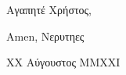 \documentclass[a4paper,12pt]{article}
\begin{document}
    \pagestyle{plain}
    \rmfamily\normalsize
    \setlength{\parskip}{13pt}
    \setlength{\baselineskip}{17pt}

    \normalsize

    Αγαπητέ Χρήστος,

    \lipsum[1]

    \lipsum[2]

    Amen,\newline
    Νερυτηες

    XX Αύγουστος MMXXI
\end{document}
